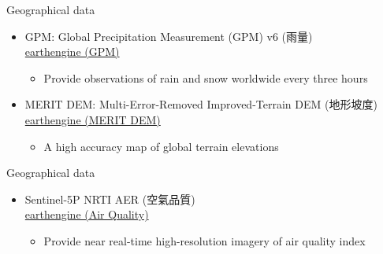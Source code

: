 \documentclass[hyperref={pdfpagelabels=false}]{beamer}
\begin{document}
\begin{frame}{Geographical data}
	\begin{itemize} 
		\item GPM: Global Precipitation Measurement (GPM) v6 (雨量)
		 \\ \href{https://developers.google.com/earth-engine/datasets/catalog/NASA_GPM_L3_IMERG_V06}{earthengine (GPM)}  
		\vspace{0.2cm}
		\begin{itemize} 
			\vspace{0.2cm}
			\item Provide observations of rain and snow worldwide every three hours
		\end{itemize}
		\vspace{0.2cm}
		\item  MERIT DEM: Multi-Error-Removed Improved-Terrain DEM (地形坡度)
		 \\ \href{https://developers.google.com/earth-engine/datasets/catalog/MERIT_DEM_v1_0_3}{earthengine (MERIT DEM)}  
		\vspace{0.2cm}
		\begin{itemize} 
			\vspace{0.2cm}
			\item A high accuracy map of global terrain elevations
		\end{itemize}
		\vspace{0.2cm}
		
		
	\end{itemize}
\end{frame}



\begin{frame}{Geographical data}
	\begin{itemize} 
		\item Sentinel-5P NRTI AER (空氣品質)
		\\ \href{https://developers.google.com/earth-engine/datasets/tags/air-quality}{earthengine (Air Quality)}  
		\vspace{0.2cm}
		\begin{itemize} 
			\vspace{0.2cm}
			\item Provide near real-time high-resolution imagery of air quality index
		\end{itemize}
	
		
	\end{itemize}
\end{frame}
\end{document}
